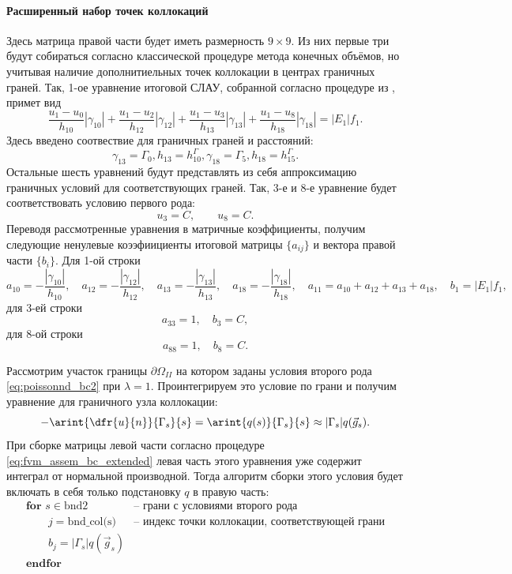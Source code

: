 \paragraph{Расширенный набор точек коллокаций}
Здесь матрица правой части будет иметь размерность $9\times9$.
Из них первые три будут собираться согласно классической процедуре
метода конечных объёмов, но учитывая наличие дополнитиельных точек коллокации в центрах
граничных граней. Так, 1-ое уравнение итоговой СЛАУ, собранной согласно процедуре из
,
примет вид
$$
\frac{u_1 - u_0}{h_{10}}|\gamma_{10}|
+\frac{u_1 - u_2}{h_{12}}|\gamma_{12}|
+\frac{u_1 - u_3}{h_{13}}|\gamma_{13}|
+\frac{u_1 - u_8}{h_{18}}|\gamma_{18}|
= |E_1| f_1.
$$
Здесь введено соотвествие для граничных граней и расстояний:
$$
\gamma_{13} = \Gamma_0, h_{13} = h^\Gamma_{10}, \gamma_{18} = \Gamma_5, h_{18} = h^\Gamma_{15}.
$$
Остальные шесть уравнений будут представлять из себя
аппроксимацию граничных условий для соответствующих граней.
Так, 3-е и 8-е уравнение будет соответствовать условию первого рода:
$$
u_3 = C, \qquad u_8 = C.
$$
Переводя рассмотренные уравнения в матричные коэффициенты, получим
следующие ненулевые коээфиициенты итоговой матрицы $\{a_{ij}\}$ и вектора правой части $\{b_i\}$. Для 1-ой строки
$$
a_{10} = -\frac{|\gamma_{10}|}{h_{10}},  \quad
a_{12} = -\frac{|\gamma_{12}|}{h_{12}},  \quad
a_{13} = -\frac{|\gamma_{13}|}{h_{13}},  \quad
a_{18} = -\frac{|\gamma_{18}|}{h_{18}},  \quad
a_{11} = a_{10} + a_{12} + a_{13} + a_{18}, \quad
b_1 = |E_1| f_1,
$$
для 3-ей строки
$$
a_{33} = 1, \quad b_3 = C,
$$
для 8-ой строки
$$
a_{88} = 1, \quad b_8 = C.
$$

Рассмотрим участок границы $\partial\Omega_{II}$ на котором заданы условия второго рода
\cref{eq:poissonnd_bc2} при $\lambda=1$.
Проинтегрируем это условие по грани и получим уравнение для граничного узла коллокации:
\begin{equation*}
-\arint{\dfr{u}{n}}{\Gamma_s}{s} = \arint{q(s)}{\Gamma_s}{s} \approx |\Gamma_s| q(\vec g_s).
\end{equation*}
При сборке матрицы левой части согласно процедуре
\cref{eq:fvm_assem_bc_extended} левая часть этого уравнения уже содержит
интеграл от нормальной производной.
Тогда алгоритм сборки этого условия будет включать в себя только подстановку $q$ в правую часть:
\begin{equation}
\label{eq:fvm_assem_bc2_extended}
\begin{array}{ll}
\textbf{for } s \in\textrm{bnd2}                         & \textrm{-- грани с условиями второго рода}\\ 
\qquad j = \textrm{bnd\_col(s)}                          & \textrm{-- индекс точки коллокации, соответствующей грани}\\
\qquad b_{j} = |\Gamma_s| q(\vec g_s)                    & \\
\textbf{endfor}                                          & \\
\end{array}
\end{equation}

